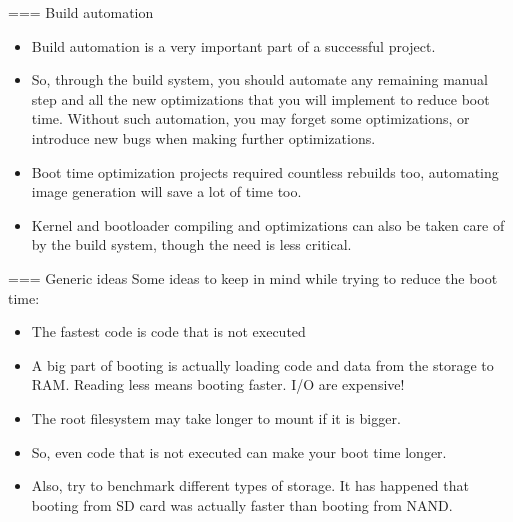 === Build automation
\begin{itemize}
\item Build automation is a very important part of a successful project.
\item So, through the build system, you should automate any remaining
      manual step and all the new optimizations that you will implement
      to reduce boot time. Without such automation, you may forget some
      optimizations, or introduce new bugs when making further optimizations.
\item Boot time optimization projects required countless rebuilds too,
      automating image generation will save a lot of time too.
\item Kernel and bootloader compiling and optimizations can also be
      taken care of by the build system, though the need is less critical.
\end{itemize}


=== Generic ideas Some ideas to keep in mind while trying to reduce the boot time:
\begin{itemize}
\item The fastest code is code that is not executed
\item A big part of booting is actually loading code and data from the
      storage to RAM. Reading less means booting faster. I/O are
      expensive!
\item The root filesystem may take longer to mount if it is bigger.
\item So, even code that is not executed can make your boot time
      longer.
\item Also, try to benchmark different types of storage. It has
      happened that booting from SD card was actually faster than
      booting from NAND.
\end{itemize}

